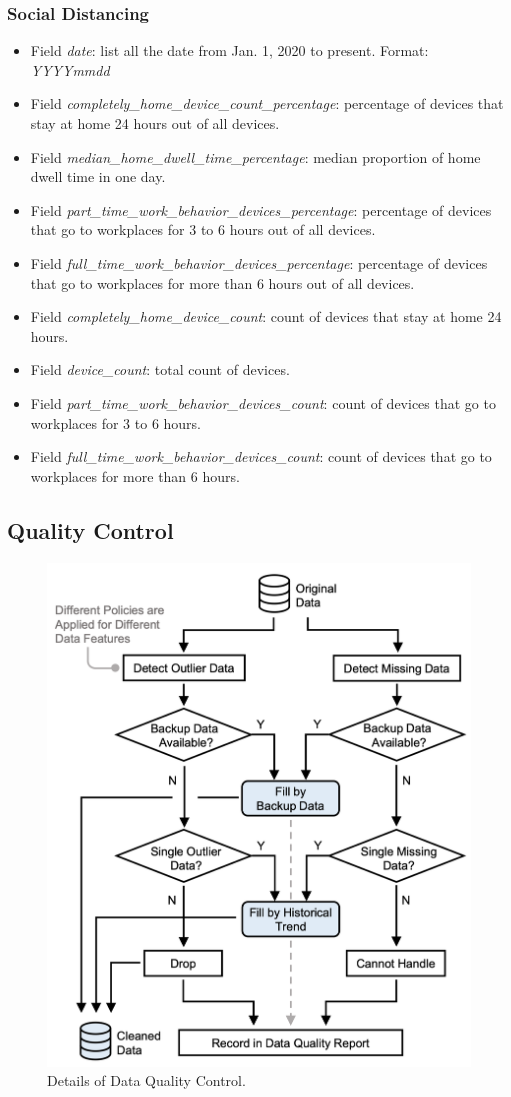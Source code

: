 \documentclass[10pt]{article}
\numberwithin{equation}{section}
\numberwithin{table}{section}
\numberwithin{figure}{section}
\begin{document}
\subsubsection{Social Distancing}
\begin{itemize}
	\item Field \textit{date}: list all the date from Jan. 1, 2020 to present. Format: \textit{YYYYmmdd}
	\item Field \textit{completely\_home\_device\_count\_percentage}: percentage of devices that stay at home 24 hours out of all devices.
	\item Field \textit{median\_home\_dwell\_time\_percentage}: median proportion of home dwell time in one day.
	\item Field \textit{part\_time\_work\_behavior\_devices\_percentage}: percentage of devices that go to workplaces for 3 to 6 hours out of all devices.
	\item Field \textit{full\_time\_work\_behavior\_devices\_percentage}: percentage of devices that go to workplaces for more than 6 hours out of all devices.
	\item Field \textit{completely\_home\_device\_count}: count of devices that stay at home 24 hours.
	\item Field \textit{device\_count}: total count of devices.
	\item Field \textit{part\_time\_work\_behavior\_devices\_count}: count of devices that go to workplaces for 3 to 6 hours.
	\item Field \textit{full\_time\_work\_behavior\_devices\_count}: count of devices that go to workplaces for more than 6 hours.
\end{itemize}
\subsection{Quality Control}
\begin{figure}[htbp]
	\centering
	\includegraphics[width=.5\textwidth]{figures/data-quality-control.png}
	\caption{Details of Data Quality Control.}

	\label{fig:dataqualitycontrol}
\end{figure}	
\end{document}
